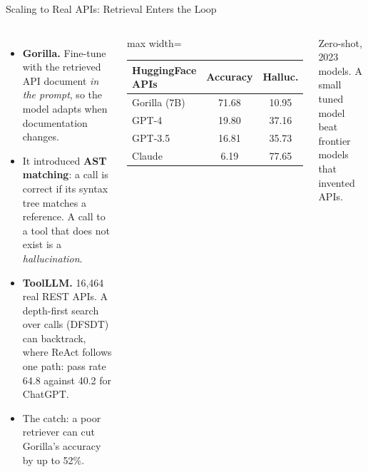 \begin{frame}{Scaling to Real APIs: Retrieval Enters the Loop}
    \begin{columns}[T,onlytextwidth]
        \begin{itemize}\itemsep0.45em
            \item \textbf{Gorilla.} Fine-tune with the retrieved API document \emph{in the prompt}, so the model adapts when documentation changes.
            \item It introduced \textbf{AST matching}: a call is correct if its syntax tree matches a reference. A call to a tool that does not exist is a \emph{hallucination}.
            \item \textbf{ToolLLM.} 16,464 real REST APIs. A depth-first search over calls (DFSDT) can backtrack, where ReAct follows one path: pass rate 64.8 against 40.2 for ChatGPT.
            \item \alert{The catch:} a poor retriever can cut Gorilla's accuracy by up to 52\%.
        \end{itemize}
        \centering
        \small
        \renewcommand{\arraystretch}{1.15}
        \begin{adjustbox}{max width=\linewidth}\begin{tabular}{lcc}
            \toprule
            \textbf{HuggingFace APIs} & \textbf{Accuracy} & \textbf{Halluc.} \\
            \midrule
            \rowcolor{KAUSTcyan!12} Gorilla (7B) & 71.68 & 10.95 \\
            GPT-4 & 19.80 & 37.16 \\
            GPT-3.5 & 16.81 & 35.73 \\
            Claude & 6.19 & 77.65 \\
            \bottomrule
        \end{tabular}\end{adjustbox}

        \vspace{0.5em}
        {\footnotesize Zero-shot, 2023 models. A small tuned model beat frontier models that invented APIs.}
    \end{columns}
\end{frame}

